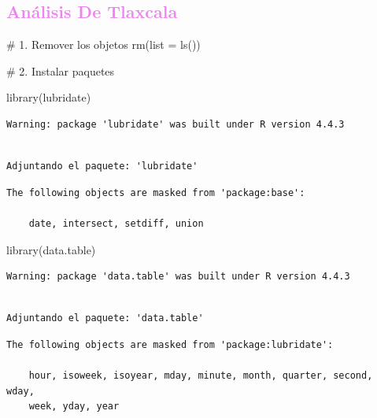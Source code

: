 \documentclass[
  letterpaper,
  DIV=11,
  numbers=noendperiod]{scrartcl}
\newenvironment{Shaded}{\begin{snugshade}}{\end{snugshade}}
\newcommand{\AttributeTok}[1]{\textcolor[rgb]{0.40,0.45,0.13}{#1}}
\newcommand{\CommentTok}[1]{\textcolor[rgb]{0.37,0.37,0.37}{#1}}
\newcommand{\FunctionTok}[1]{\textcolor[rgb]{0.28,0.35,0.67}{#1}}
\newcommand{\NormalTok}[1]{\textcolor[rgb]{0.00,0.23,0.31}{#1}}
\begin{document}
\subsection{\texorpdfstring{\textcolor{violet}{Análisis De Tlaxcala}}{}}\label{section-2}

\begin{Shaded}
\begin{Highlighting}[]
\CommentTok{\# 1. Remover los objetos}
\FunctionTok{rm}\NormalTok{(}\AttributeTok{list =} \FunctionTok{ls}\NormalTok{())}

\CommentTok{\# 2. Instalar paquetes }

\FunctionTok{library}\NormalTok{(lubridate)}
\end{Highlighting}
\end{Shaded}

\begin{verbatim}
Warning: package 'lubridate' was built under R version 4.4.3
\end{verbatim}

\begin{verbatim}

Adjuntando el paquete: 'lubridate'
\end{verbatim}

\begin{verbatim}
The following objects are masked from 'package:base':

    date, intersect, setdiff, union
\end{verbatim}

\begin{Shaded}
\begin{Highlighting}[]
\FunctionTok{library}\NormalTok{(data.table)}
\end{Highlighting}
\end{Shaded}

\begin{verbatim}
Warning: package 'data.table' was built under R version 4.4.3
\end{verbatim}

\begin{verbatim}

Adjuntando el paquete: 'data.table'
\end{verbatim}

\begin{verbatim}
The following objects are masked from 'package:lubridate':

    hour, isoweek, isoyear, mday, minute, month, quarter, second, wday,
    week, yday, year
\end{verbatim}
\end{document}
